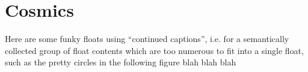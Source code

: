 \chapter{Cosmics}
\label{chap:cosmics}

Here are some funky floats using ``continued captions'', i.e. for a semantically
collected group of float contents which are too numerous to fit into a single
float, such as the pretty circles in the following figure blah blah blah